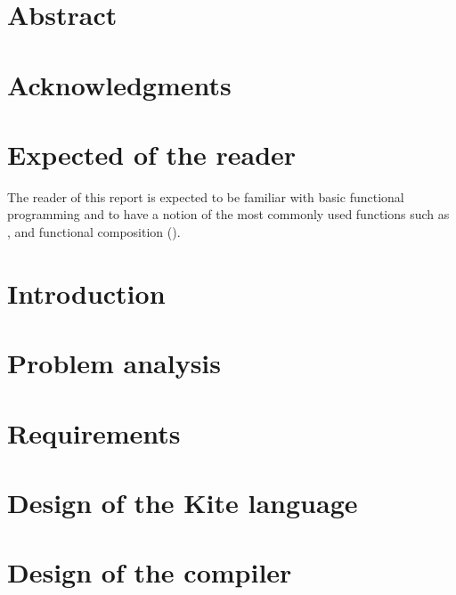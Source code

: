 \documentclass{article}
\begin{document}

\clearpage

\section*{Abstract}
\label{sec:abstract}

\clearpage

\section*{Acknowledgments}
\label{sec:acknow}


\section*{Expected of the reader}
The reader of this report is expected to be familiar with basic functional programming and to have a notion of the most commonly used functions such as ,  and functional composition ().
\clearpage

\tableofcontents
\clearpage

\section{Introduction}
\label{sec:intro}

\clearpage

\section{Problem analysis}
\label{sec:probanal}

\clearpage

\section{Requirements}
\label{sec:requirements}

\clearpage

\section{Design of the Kite language}
\label{sec:kite-design}

\clearpage

\section{Design of the compiler}
\label{sec:compiler-design}

\clearpage
\end{document}
